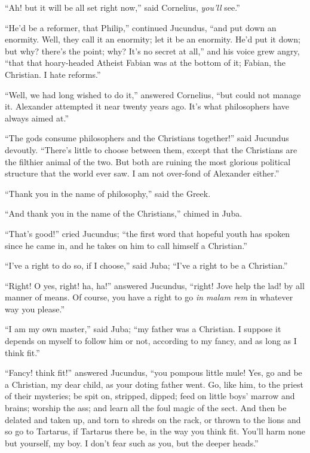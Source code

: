 ``Ah! but it will be all set right now,'' said Cornelius, \emph{you'll}
see.''

``He'd be a reformer, that Philip,'' continued Jucundus,
``and put down an enormity. Well, they call it an enormity; let it
be an enormity. He'd put it down; but why? there's the point; why? It's
no secret at all,'' and his voice grew angry, ``that that
hoary-headed Atheist Fabian was at the bottom of it; Fabian, the
Christian. I hate reforms.''

``Well, we had long wished to do it,'' answered Cornelius,
``but could not manage it. Alexander attempted it near twenty
years ago. It's what philosophers have always aimed at.''

``The gods consume philosophers and the Christians
together!'' said Jucundus devoutly. ``There's little to choose
between them, except that the Christians are the filthier animal of
the two. But both are ruining the most glorious political structure
that the world ever saw. I am not over-fond of Alexander either.''

``Thank you in the name of philosophy,'' said the Greek.

``And thank you in the name of the Christians,'' chimed in
Juba.

``That's good!'' cried Jucundus; ``the first word that
hopeful youth has spoken since he came in, and he takes on him to call
himself a Christian.''

``I've a right to do so, if I choose,'' said Juba; ``I've
a right to be a Christian.''

``Right! O yes, right! ha, ha!'' answered Jucundus,
``right! Jove help the lad! by all manner of means. Of course, you
have a right to go \emph{in malam rem} in whatever way you
please.''

``I am my own master,'' said Juba; ``my father was a
Christian. I suppose it depends on myself to follow him or not,
according to my fancy, and as long as I think fit.''

``Fancy! think fit!'' answered Jucundus, ``you pompous
little mule! Yes, go and be a Christian, my dear child, as your doting
father went. Go, like him, to the priest of their mysteries; be spit
on, stripped, dipped; feed on little boys' marrow and brains;
worship the ass; and learn all the foul magic of the sect. And then be
delated and taken up, and torn to shreds on the rack, or thrown to the
lions and so go to Tartarus, if Tartarus there be, in the way you
think fit. You'll harm none but yourself, my boy. I don't fear such as
you, but the deeper heads.''

